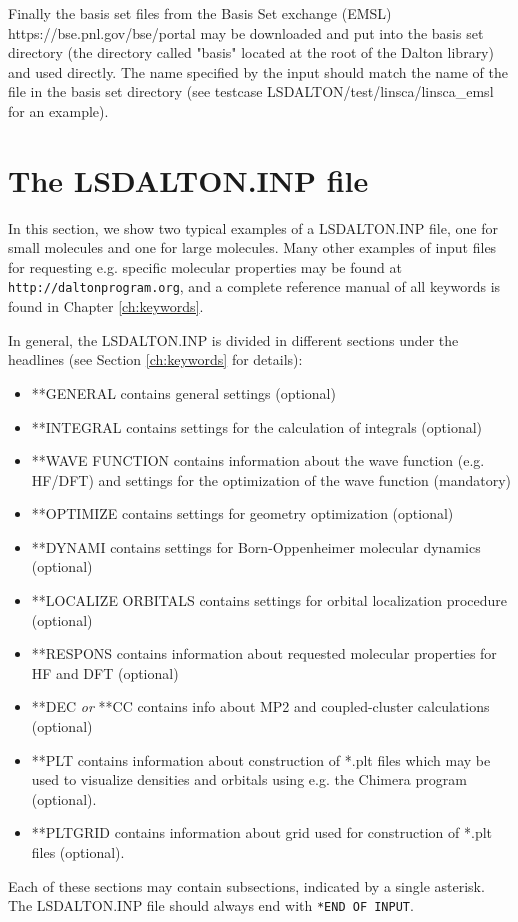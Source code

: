 Finally the basis set files from the Basis Set exchange (EMSL) 
https://bse.pnl.gov/bse/portal may be downloaded and put into 
the basis set directory (the directory called "basis" located at the root of the Dalton library) and used directly. The name specified by 
the input should match the name of the file in the basis set directory
(see testcase {LSDALTON/test/linsca/linsca\_emsl} for an example).

\section{The LSDALTON.INP file}
\label{sec:daltoninp}
In this section, we show two typical examples of a LSDALTON.INP file, one
for small molecules and one for large molecules. Many other examples
of input files for requesting e.g. specific molecular properties may be found
at \verb|http://daltonprogram.org|, and
a complete reference manual of all keywords is found in Chapter \ref{ch:keywords}.

In general, the LSDALTON.INP is divided in different sections under
the headlines (see Section \ref{ch:keywords} for details):
\begin{itemize}
\item **GENERAL contains general settings (optional)
\item **INTEGRAL contains settings for the calculation of integrals (optional)
\item **WAVE FUNCTION contains information about the wave function (e.g. HF/DFT) and settings
for the optimization of the wave function (mandatory)
\item **OPTIMIZE contains settings for geometry optimization (optional)
\item **DYNAMI contains settings for Born-Oppenheimer molecular dynamics (optional)
\item **LOCALIZE ORBITALS contains settings for orbital localization procedure (optional)
\item **RESPONS contains information about requested molecular properties for HF and DFT (optional)
\item **DEC \emph{or} **CC contains info about MP2 and coupled-cluster calculations (optional)
\item **PLT contains information about construction of *.plt files which may be used to visualize densities and orbitals using e.g. the Chimera program~\cite{chimera} (optional).
\item **PLTGRID contains information about grid used for construction of *.plt files (optional).
\end{itemize}
Each of these sections may contain subsections, indicated by a single asterisk.
The LSDALTON.INP file should always end with \verb|*END OF INPUT|. 

